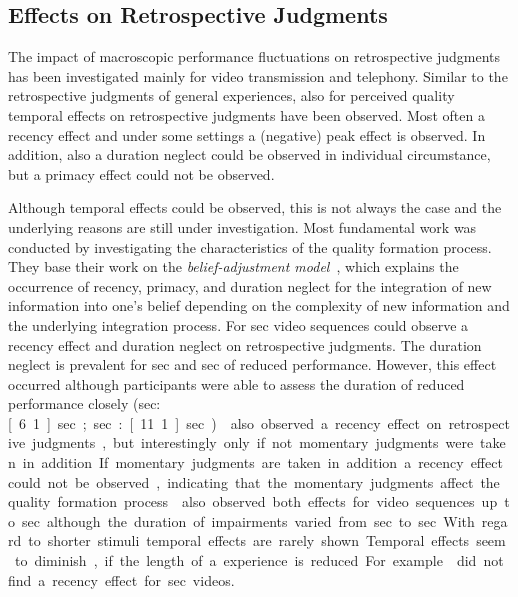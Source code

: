 \subsection{Effects on Retrospective Judgments}
The impact of macroscopic performance fluctuations on retrospective judgments has been investigated mainly for video transmission and telephony.
Similar to the retrospective judgments of general experiences, also for perceived quality temporal effects on retrospective judgments have been observed.
Most often a recency effect and under some settings a (negative) peak effect is observed.
In addition, also a duration neglect could be observed in individual circumstance, but a primacy effect could not be observed.

Although temporal effects could be observed, this is not always the case and the underlying reasons are still under investigation.
Most fundamental work was conducted by \citet{hands_recency_2001} investigating the characteristics of the quality formation process.
They base their work on the \emph{belief-adjustment model}~\citep{hogarth_order_1992}, which explains the occurrence of recency, primacy, and duration neglect for the integration of new information into one's belief depending on the complexity of new information and the underlying integration process.
For \unit[30]{sec} video sequences \citet{hands_recency_2001} could observe a recency effect and duration neglect on retrospective judgments.
The duration neglect is prevalent for \unit[5]{sec} and \unit[10]{sec} of reduced performance.
However, this effect occurred although participants were able to assess the duration of reduced performance closely (\unit[5]{sec}: \unit[6.1]{sec}; \unit[10]{sec}: \unit[11.1]{sec}).
\citet{hands_recency_2001} also observed a recency effect on retrospective judgments, but interestingly only if not momentary judgments were taken in addition.
If momentary judgments are taken in addition a recency effect could not be observed, indicating that the momentary judgments affect the quality formation process.
\citet{hamberg_time-varying_1999} also observed both effects for video sequences up to \unit[180]{sec} although the duration of impairments varied from \unit[2]{sec} to \unit[10]{sec}.
With regard to shorter stimuli temporal effects are rarely shown.
Temporal effects seem to diminish, if the length of a experience is reduced.
For example \citet{ninassi_considering_2009} did not find a recency effect for \unit[8]{sec} videos.


